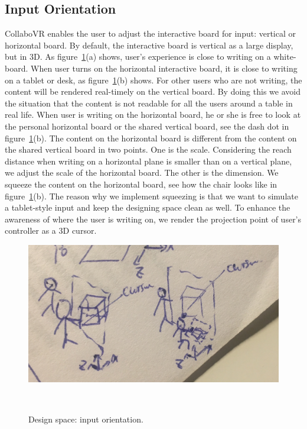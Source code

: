 \documentclass{sigchi}
\begin{document}
\subsection{Input Orientation}
CollaboVR enables the user to adjust the interactive board for input: vertical or horizontal board. By default, the interactive board is vertical as a large display, but in 3D. As figure~\ref{fig:inputorientation}(a) shows, user's experience is close to writing on a white-board. When user turns on the horizontal interactive board, it is close to writing on a tablet or desk, as figure~\ref{fig:inputorientation}(b) shows. For other users who are not writing, the content will be rendered real-timely on the vertical board. By doing this we avoid the situation that the content is not readable for all the users around a table in real life. When user is writing on the horizontal board, he or she is free to look at the personal horizontal board or the shared vertical board, see the dash dot in figure~\ref{fig:inputorientation}(b). The content on the horizontal board is different from the content on the shared vertical board in two points. One is the scale. Considering the reach distance when writing on a horizontal plane is smaller than on a vertical plane, we adjust the scale of the horizontal board. The other is the dimension. We squeeze the content on the horizontal board, see how the chair looks like in figure~\ref{fig:inputorientation}(b). The reason why we implement squeezing is that we want to simulate a tablet-style input and keep the designing space clean as well. To enhance the awareness of where the user is writing on, we render the projection point of user's controller as a 3D cursor.

\begin{figure}[b!]
 \centering
 \includegraphics[width=0.9\columnwidth]{inputorientation.jpg}
 \caption{Design space: input orientation.
 }~\label{fig:inputorientation}
\end{figure}
\end{document}
